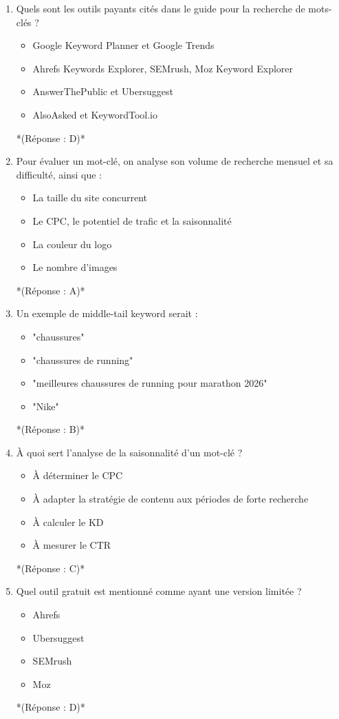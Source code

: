 \documentclass[12pt,a4paper,twoside]{report}
\begin{document}
\begin{enumerate}
\item Quels sont les outils payants cités dans le guide pour la recherche de mots-clés ?
\begin{itemize}
\item[A)] Google Keyword Planner et Google Trends
\item[B)] Ahrefs Keywords Explorer, SEMrush, Moz Keyword Explorer
\item[C)] AnswerThePublic et Ubersuggest
\item[D)] AlsoAsked et KeywordTool.io
\end{itemize}
*(Réponse : D)*

\item Pour évaluer un mot-clé, on analyse son volume de recherche mensuel et sa difficulté, ainsi que :
\begin{itemize}
\item[A)] La taille du site concurrent
\item[B)] Le CPC, le potentiel de trafic et la saisonnalité
\item[C)] La couleur du logo
\item[D)] Le nombre d'images
\end{itemize}
*(Réponse : A)*

\item Un exemple de middle-tail keyword serait :
\begin{itemize}
\item[A)] "chaussures"
\item[B)] "chaussures de running"
\item[C)] "meilleures chaussures de running pour marathon 2026"
\item[D)] "Nike"
\end{itemize}
*(Réponse : B)*

\item À quoi sert l'analyse de la saisonnalité d'un mot-clé ?
\begin{itemize}
\item[A)] À déterminer le CPC
\item[B)] À adapter la stratégie de contenu aux périodes de forte recherche
\item[C)] À calculer le KD
\item[D)] À mesurer le CTR
\end{itemize}
*(Réponse : C)*

\item Quel outil gratuit est mentionné comme ayant une version limitée ?
\begin{itemize}
\item[A)] Ahrefs
\item[B)] Ubersuggest
\item[C)] SEMrush
\item[D)] Moz
\end{itemize}
*(Réponse : D)*


\end{enumerate}
\end{document}
